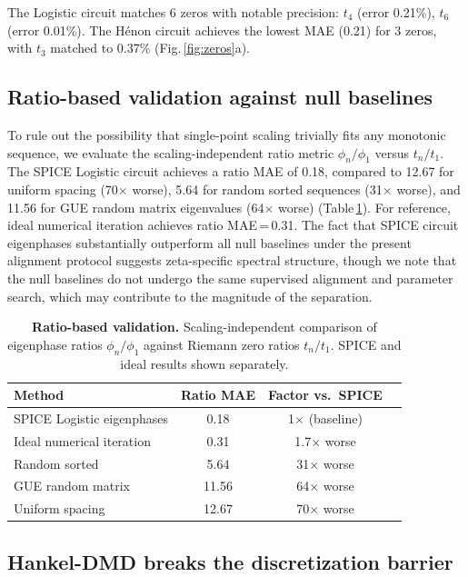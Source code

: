 \documentclass[11pt]{article}
\begin{document}
The Logistic circuit matches 6 zeros with notable precision: $t_4$ (error 0.21\%), $t_6$ (error 0.01\%). The H\'enon circuit achieves the lowest MAE (0.21) for 3 zeros, with $t_3$ matched to 0.37\% (Fig.\,\ref{fig:zeros}a).

\subsection*{Ratio-based validation against null baselines}

To rule out the possibility that single-point scaling trivially fits any monotonic sequence, we evaluate the scaling-independent ratio metric $\phi_n/\phi_1$ versus $t_n/t_1$. The SPICE Logistic circuit achieves a ratio MAE of 0.18, compared to 12.67 for uniform spacing (70$\times$ worse), 5.64 for random sorted sequences (31$\times$ worse), and 11.56 for GUE random matrix eigenvalues (64$\times$ worse) (Table\,\ref{tab:ratio}). For reference, ideal numerical iteration achieves ratio MAE\,=\,0.31. The fact that SPICE circuit eigenphases substantially outperform all null baselines under the present alignment protocol suggests zeta-specific spectral structure, though we note that the null baselines do not undergo the same supervised alignment and parameter search, which may contribute to the magnitude of the separation.

\begin{table}[h]
\centering
\caption{\textbf{Ratio-based validation.} Scaling-independent comparison of eigenphase ratios $\phi_n/\phi_1$ against Riemann zero ratios $t_n/t_1$. SPICE and ideal results shown separately.}
\label{tab:ratio}
\begin{tabular}{lccc}
\toprule
Method & Ratio MAE & Factor vs.\ SPICE \\
\midrule
SPICE Logistic eigenphases & 0.18 & 1$\times$ (baseline) \\
Ideal numerical iteration & 0.31 & 1.7$\times$ worse \\
Random sorted & 5.64 & 31$\times$ worse \\
GUE random matrix & 11.56 & 64$\times$ worse \\
Uniform spacing & 12.67 & 70$\times$ worse \\
\bottomrule
\end{tabular}
\end{table}

\subsection*{Hankel-DMD breaks the discretization barrier}
\end{document}
